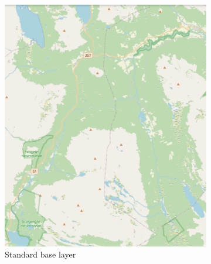 \begin{figure}[h]
     \centering
     \begin{subfigure}[b]{0.45\textwidth}
         \centering
         \includegraphics[width=\textwidth]{figures/base_layer_standard.pdf}
         \caption{Standard base layer}
         \label{fig:maplayer:standardlayer}
     \end{subfigure}
     \hfill
     \begin{subfigure}[b]{0.45\textwidth}
         \centering

\end{subfigure}
\end{figure}
